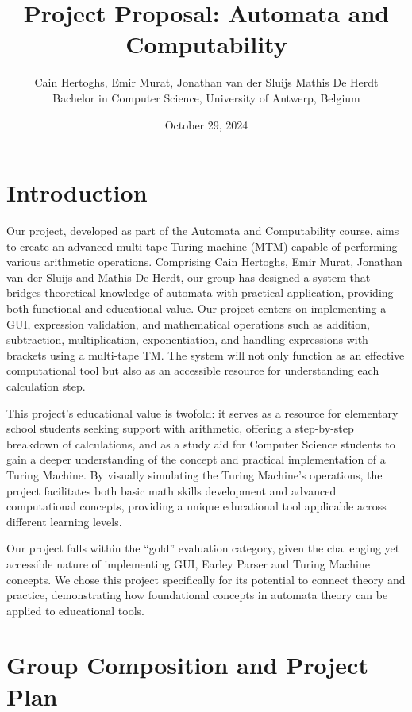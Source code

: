 \documentclass[a4paper,12pt]{article}
\title{Project Proposal: Automata and Computability}
\author{Cain Hertoghs, Emir Murat, Jonathan van der Sluijs Mathis De Herdt \\
Bachelor in Computer Science, University of Antwerp, Belgium}
\date{October 29, 2024}
\begin{document}
\maketitle

\section*{Introduction}

Our project, developed as part of the Automata and Computability course, aims to create an advanced multi-tape Turing machine (MTM) capable of performing various arithmetic operations. Comprising Cain Hertoghs, Emir Murat, Jonathan van der Sluijs and Mathis De Herdt, our group has designed a system that bridges theoretical knowledge of automata with practical application, providing both functional and educational value. Our project centers on implementing a GUI, expression validation, and mathematical operations such as addition, subtraction, multiplication, exponentiation, and handling expressions with brackets using a multi-tape TM. The system will not only function as an effective computational tool but also as an accessible resource for understanding each calculation step.

This project’s educational value is twofold: it serves as a resource for elementary school students seeking support with arithmetic, offering a step-by-step breakdown of calculations, and as a study aid for Computer Science students to gain a deeper understanding of the concept and practical implementation of a Turing Machine. By visually simulating the Turing Machine’s operations, the project facilitates both basic math skills development and advanced computational concepts, providing a unique educational tool applicable across different learning levels.

Our project falls within the “gold” evaluation category, given the challenging yet accessible nature of implementing GUI, Earley Parser and Turing Machine concepts. We chose this project specifically for its potential to connect theory and practice, demonstrating how foundational concepts in automata theory can be applied to educational tools.
\newpage

\section*{Group Composition and Project Plan}
\end{document}
